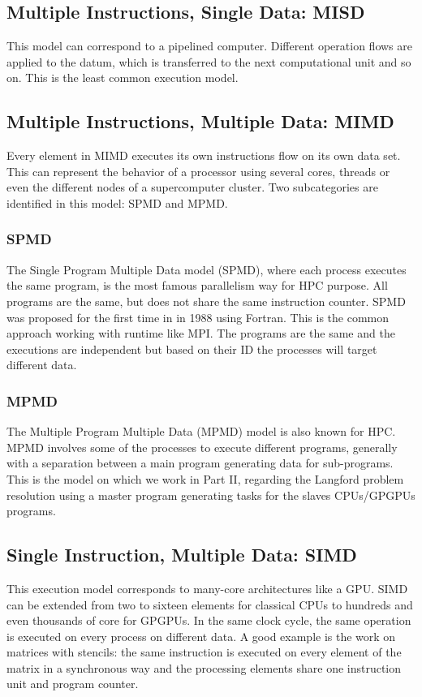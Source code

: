 \subsection{Multiple Instructions, Single Data: MISD}
This model can correspond to a pipelined computer.
Different operation flows are applied to the datum, which is transferred to the next computational unit and so on. 
This is the least common execution model.


\subsection{Multiple Instructions, Multiple Data: MIMD}
Every element in MIMD executes its own instructions flow on its own data set. 
This can represent the behavior of a processor using several cores, threads or even the different nodes of a supercomputer cluster. 
Two subcategories are identified in this model: SPMD and MPMD.

\subsubsection{SPMD}
The Single Program Multiple Data model (SPMD), where each process executes the same program, is the most famous parallelism way for HPC purpose.
All programs are the same, but does not share the same instruction counter. 
SPMD was proposed for the first time in \cite{darema1988single} in 1988 using Fortran.
This is the common approach working with runtime like MPI. 
The programs are the same and the executions are independent but based on their ID the processes will target different data. 

\subsubsection{MPMD}
The Multiple Program Multiple Data (MPMD) model is also known for HPC.
MPMD involves some of the processes to execute different programs, generally with a separation between a main program generating data for sub-programs. 
This is the model on which we work in Part II, regarding the Langford problem resolution using a master program generating tasks for the slaves CPUs/GPGPUs programs.

\subsection{Single Instruction, Multiple Data: SIMD}
This execution model corresponds to many-core architectures like a GPU. 
SIMD can be extended from two to sixteen elements for classical CPUs to hundreds and even thousands of core for GPGPUs. 
In the same clock cycle, the same operation is executed on every process on different data. 
A good example is the work on matrices with stencils: the same instruction is executed on every element of the matrix in a synchronous way and the processing elements share one instruction unit and program counter. 

